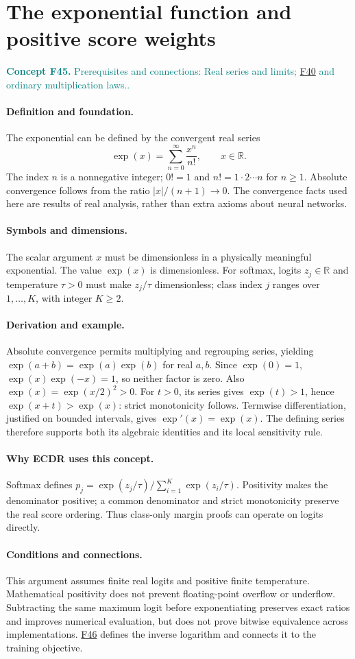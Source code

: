 \documentclass[11pt,a4paper]{article}
\newcommand{\R}{\mathbb R}
\newcommand{\abs}[1]{\left\lvert#1\right\rvert}
\newcommand{\conceptid}{Front matter}
\newcommand{\concept}[3]{\clearpage\renewcommand{\conceptid}{#1}%
\section{#2}\label{concept:#1}%
\textcolor{teal}{\textbf{Concept #1.} Prerequisites and connections: #3.}\par
\typeout{ECDR-CONCEPT-START #1 PAGE=\thepage}}
\begin{document}
\concept{F45}{The exponential function and positive score weights}{Real series and limits; \hyperref[concept:F40]{F40} and ordinary multiplication laws.}
\paragraph{Definition and foundation.}
The exponential can be defined by the convergent real series
\[
 \exp(x)=\sum_{n=0}^{\infty}\frac{x^n}{n!},\qquad x\in\R.
\]
The index $n$ is a nonnegative integer; $0!=1$ and $n!=1\cdot2\cdots n$ for $n\ge1$. Absolute convergence follows from the ratio $\abs x/(n+1)\to0$. The convergence facts used here are results of real analysis, rather than extra axioms about neural networks.
\paragraph{Symbols and dimensions.}
The scalar argument $x$ must be dimensionless in a physically meaningful exponential. The value $\exp(x)$ is dimensionless. For softmax, logits $z_j\in\R$ and temperature $\tau>0$ must make $z_j/\tau$ dimensionless; class index $j$ ranges over $1,\ldots,K$, with integer $K\ge2$.
\paragraph{Derivation and example.}
Absolute convergence permits multiplying and regrouping series, yielding $\exp(a+b)=\exp(a)\exp(b)$ for real $a,b$. Since $\exp(0)=1$, $\exp(x)\exp(-x)=1$, so neither factor is zero. Also $\exp(x)=\exp(x/2)^2>0$. For $t>0$, its series gives $\exp(t)>1$, hence $\exp(x+t)>\exp(x)$: strict monotonicity follows. Termwise differentiation, justified on bounded intervals, gives $\exp'(x)=\exp(x)$. The defining series therefore supports both its algebraic identities and its local sensitivity rule.
\paragraph{Why ECDR uses this concept.}
Softmax defines $p_j=\exp(z_j/\tau)/\sum_{i=1}^{K}\exp(z_i/\tau)$. Positivity makes the denominator positive; a common denominator and strict monotonicity preserve the real score ordering. Thus class-only margin proofs can operate on logits directly.
\paragraph{Conditions and connections.}
This argument assumes finite real logits and positive finite temperature. Mathematical positivity does not prevent floating-point overflow or underflow. Subtracting the same maximum logit before exponentiating preserves exact ratios and improves numerical evaluation, but does not prove bitwise equivalence across implementations. \hyperref[concept:F46]{F46} defines the inverse logarithm and connects it to the training objective.
\par\label{endconcept:F45}
\end{document}

